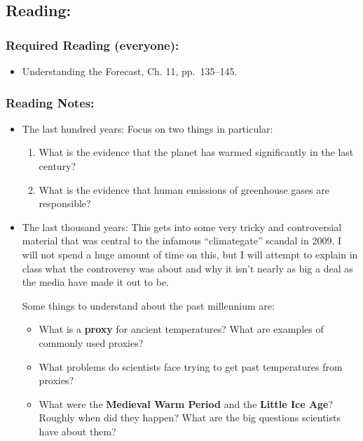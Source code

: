 \documentclass[
]{article}
\providecommand{\tightlist}{%
  \setlength{\itemsep}{0pt}\setlength{\parskip}{0pt}}
\begin{document}
\hypertarget{reading-12}{%
\subsection{Reading:}\label{reading-12}}

\hypertarget{required-reading-everyone-10}{%
\subsubsection{Required Reading
(everyone):}\label{required-reading-everyone-10}}

\begin{itemize}
\tightlist
\item
  Understanding the Forecast, Ch. 11, pp.~135--145.
\end{itemize}

\hypertarget{reading-notes-10}{%
\subsubsection{Reading Notes:}\label{reading-notes-10}}

\begin{itemize}
\item
  The last hundred years: Focus on two things in particular:

  \begin{enumerate}
  \def\labelenumi{\arabic{enumi}.}
  \tightlist
  \item
    What is the evidence that the planet has warmed significantly in the
    last century?
  \item
    What is the evidence that human emissions of greenhouse gases are
    responsible?
  \end{enumerate}
\item
  The last thousand years: This gets into some very tricky and
  controversial material that was central to the infamous
  ``climategate'' scandal in 2009. I will not spend a huge amount of
  time on this, but I will attempt to explain in class what the
  controversy was about and why it isn't nearly as big a deal as the
  media have made it out to be.

  Some things to understand about the past millennium are:

  \begin{itemize}
  \tightlist
  \item
    What is a \textbf{proxy} for ancient temperatures? What are examples
    of commonly used proxies?
  \item
    What problems do scientists face trying to get past temperatures
    from proxies?
  \item
    What were the \textbf{Medieval Warm Period} and the \textbf{Little
    Ice Age}? Roughly when did they happen? What are the big questions
    scientists have about them?
  \end{itemize}
\end{itemize}
\end{document}
